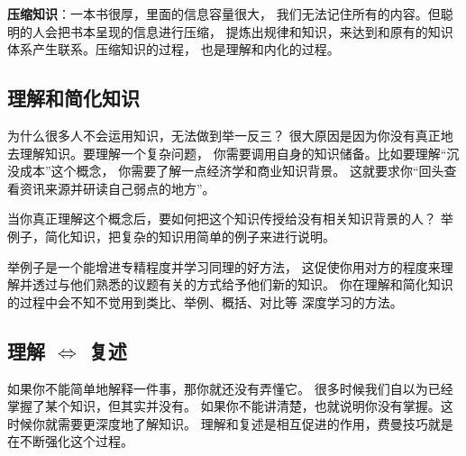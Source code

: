 \documentclass[../main.tex]{subfiles}
\begin{document}
\textbf{压缩知识}：一本书很厚，里面的信息容量很大，
我们无法记住所有的内容。但聪明的人会把书本呈现的信息进行压缩，
提炼出规律和知识，来达到和原有的知识体系产生联系。压缩知识的过程，
也是理解和内化的过程。
%
\subsection{理解和简化知识}
为什么很多人不会运用知识，无法做到举一反三？
很大原因是因为你没有真正地去理解知识。要理解一个复杂问题，
你需要调用自身的知识储备。比如要理解``沉没成本''这个概念，
你需要了解一点经济学和商业知识背景。
这就要求你``回头查看资讯来源并研读自己弱点的地方''。

当你真正理解这个概念后，要如何把这个知识传授给没有相关知识背景的人？
举例子，简化知识，把复杂的知识用简单的例子来进行说明。

举例子是一个能增进专精程度并学习同理的好方法，
这促使你用对方的程度来理解并透过与他们熟悉的议题有关的方式给予他们新的知识。
你在理解和简化知识的过程中会不知不觉用到类比、举例、概括、对比等
深度学习的方法。
%
\subsection{理解 $ \iff $ 复述}
如果你不能简单地解释一件事，那你就还没有弄懂它。
很多时候我们自以为已经掌握了某个知识，但其实并没有。
如果你不能讲清楚，也就说明你没有掌握。这时候你就需要更深度地了解知识。
理解和复述是相互促进的作用，费曼技巧就是在不断强化这个过程。
%
\end{document}
